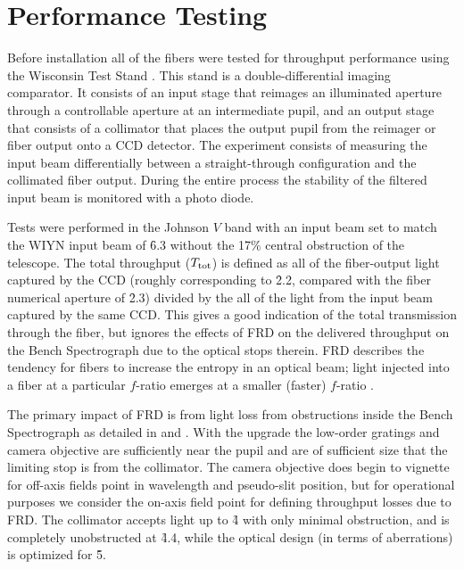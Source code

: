 \chapter{\GP Performance Testing}
\label{chap:GPtesting}

Before installation all of the \GP fibers were tested for throughput
performance using the Wisconsin Test Stand
\citep{Bershady04,Crause08,Eigenbrot12}. This stand is a
double-differential imaging comparator. It consists of an input stage
that reimages an illuminated aperture through a controllable aperture
at an intermediate pupil, and an output stage that consists of a
collimator that places the output pupil from the reimager or fiber
output onto a CCD detector. The experiment consists of measuring the
input beam differentially between a straight-through configuration and
the collimated fiber output. During the entire process the stability
of the filtered input beam is monitored with a photo diode.

Tests were performed in the Johnson $V$ band with an input beam set to
match the WIYN input beam of \f6.3 without the 17\% central
obstruction of the telescope. The total throughput ($T_{\rm tot}$) is
defined as all of the fiber-output light captured by the CCD (roughly
corresponding to \f2.2, compared with the fiber numerical aperture
of \f2.3)
divided by the all of the light from the input beam captured by the
same CCD. This gives a good indication of the total transmission
through the fiber, but ignores the effects of FRD on the delivered
throughput on the Bench Spectrograph due to the optical stops
therein. FRD describes the tendency for fibers to increase the entropy
in an optical beam; light injected into a fiber at a particular
$f$-ratio emerges at a smaller (faster) $f$-ratio \citep{Angel77}.

The primary impact of FRD is from light loss from obstructions inside
the Bench Spectrograph as detailed in \cite{Bershady04} and
\cite{Bershady05}.  With the upgrade \citep{Bershady08} the low-order
gratings and camera objective are sufficiently near the pupil and are
of sufficient size that the limiting stop is from the collimator. The
camera objective does begin to vignette for off-axis fields point in
wavelength and pseudo-slit position, but for operational purposes we
consider the on-axis field point for defining throughput losses due
to FRD.  The collimator accepts light up to \f4 with only minimal
obstruction, and is completely unobstructed at \f4.4, while the
optical design (in terms of aberrations) is optimized for \f5.

